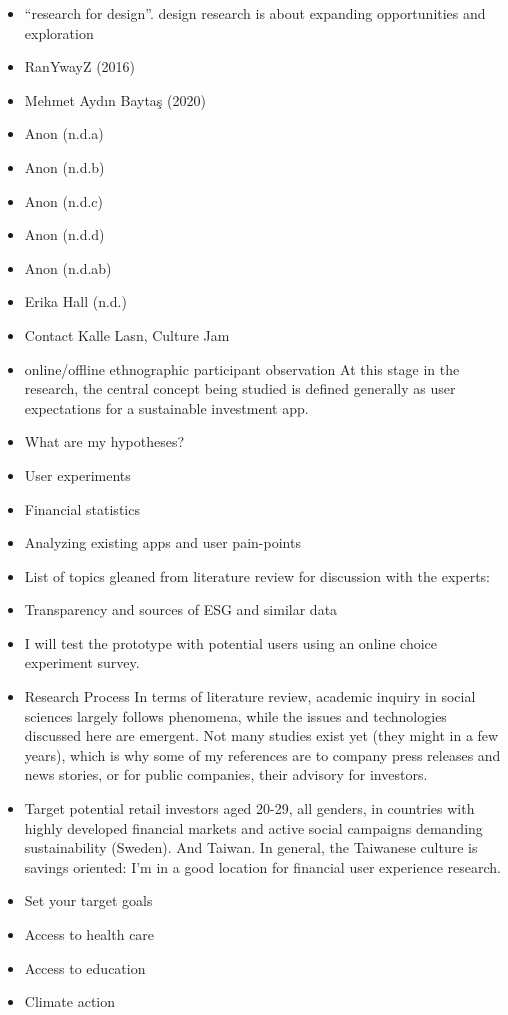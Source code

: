\documentclass[
  letterpaper,
  DIV=11,
  numbers=noendperiod]{scrartcl}
\begin{document}
\begin{itemize}
\item
  ``research for design''. design research is about expanding
  opportunities and exploration
\item
  RanYwayZ (2016)
\item
  Mehmet Aydın Baytaş (2020)
\item
  Anon (n.d.a)
\item
  Anon (n.d.b)
\item
  Anon (n.d.c)
\item
  Anon (n.d.d)
\item
  Anon (n.d.ab)
\item
  Erika Hall (n.d.)
\item
  Contact Kalle Lasn, Culture Jam
\item
  online/offline ethnographic participant observation At this stage in
  the research, the central concept being studied is defined generally
  as user expectations for a sustainable investment app.
\item
  What are my hypotheses?
\item
  User experiments
\item
  Financial statistics
\item
  Analyzing existing apps and user pain-points
\item
  List of topics gleaned from literature review for discussion with the
  experts:
\item
  Transparency and sources of ESG and similar data
\item
  I will test the prototype with potential users using an online choice
  experiment survey.
\item
  Research Process In terms of literature review, academic inquiry in
  social sciences largely follows phenomena, while the issues and
  technologies discussed here are emergent. Not many studies exist yet
  (they might in a few years), which is why some of my references are to
  company press releases and news stories, or for public companies,
  their advisory for investors.
\item
  Target potential retail investors aged 20-29, all genders, in
  countries with highly developed financial markets and active social
  campaigns demanding sustainability (Sweden). And Taiwan. In general,
  the Taiwanese culture is savings oriented: I'm in a good location for
  financial user experience research.
\item
  Set your target goals
\item
  Access to health care
\item
  Access to education
\item
  Climate action
\end{itemize}
\end{document}
